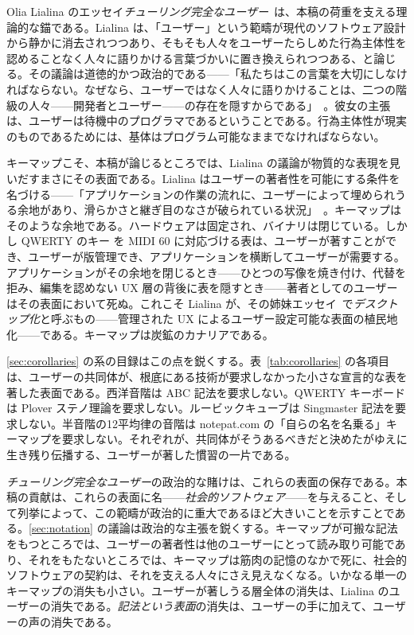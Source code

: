 \documentclass[10pt,letterpaper,twocolumn]{article}
\DeclareRobustCommand{\key}[1]{\tikz[baseline=(k.base)]{%
 \node[fill=keystroke, rounded corners=1.3pt, inner xsep=2.4pt,
    inner ysep=1.9pt, anchor=base, yshift=-1.2pt] at (0,0)
  {\footnotesize\ttfamily\bfseries\vphantom{A}\phantom{#1}};
 \node[draw=keystroke, line width=0.4pt, fill=keyfill,
    rounded corners=1.3pt, inner xsep=2.4pt, inner ysep=1.9pt,
    anchor=base] (k) at (0,0)
  {\footnotesize\ttfamily\bfseries\vphantom{A}#1};}}
\begin{document}
Olia Lialina のエッセイ\emph{チューリング完全なユーザー}~\citep{lialina2012turing,lialina2021turingbook}は、本稿の荷重を支える理論的な錨である。Lialina は、「ユーザー」という範疇が現代のソフトウェア設計から静かに消去されつつあり、そもそも人々をユーザーたらしめた行為主体性を認めることなく人々に語りかける言葉づかいに置き換えられつつある、と論じる。その議論は道徳的かつ政治的である——「私たちはこの言葉を大切にしなければならない。なぜなら、ユーザーではなく人々に語りかけることは、二つの階級の人々——開発者とユーザー——の存在を隠すからである」~\citep{lialina2012turing}。彼女の主張は、ユーザーは待機中のプログラマであるということである。行為主体性が現実のものであるためには、基体はプログラム可能なままでなければならない。

キーマップこそ、本稿が論じるところでは、Lialina の議論が物質的な表現を見いだすまさにその表面である。Lialina はユーザーの著者性を可能にする条件を名づける——「アプリケーションの作業の流れに、ユーザーによって埋められうる余地があり、滑らかさと継ぎ目のなさが破られている状況」~\citep{lialina2012turing}。キーマップはそのような余地である。ハードウェアは固定され、バイナリは閉じている。しかし QWERTY のキー \key{A} を MIDI 60 に対応づける表は、ユーザーが著すことができ、ユーザーが版管理でき、アプリケーションを横断してユーザーが需要する。アプリケーションがその余地を閉じるとき——ひとつの写像を焼き付け、代替を拒み、編集を認めない UX 層の背後に表を隠すとき——著者としてのユーザーはその表面において死ぬ。これこそ Lialina が、その姉妹エッセイ~\citep{lialina2018rich}で\emph{デスクトップ化}と呼ぶもの——管理された UX によるユーザー設定可能な表面の植民地化——である。キーマップは炭鉱のカナリアである。

\textsection\ref{sec:corollaries} の系の目録はこの点を鋭くする。表~\ref{tab:corollaries} の各項目は、ユーザーの共同体が、根底にある技術が要求しなかった小さな宣言的な表を著した表面である。西洋音階は ABC 記法を要求しない。QWERTY キーボードは Plover ステノ理論を要求しない。ルービックキューブは Singmaster 記法を要求しない。半音階の12平均律の音階は notepat.com の「自らの名を名乗る」キーマップを要求しない。それぞれが、共同体がそうあるべきだと決めたがゆえに生き残り伝播する、ユーザーが著した慣習の一片である。

\emph{チューリング完全なユーザー}の政治的な賭けは、これらの表面の保存である。本稿の貢献は、これらの表面に名——\emph{社会的ソフトウェア}——を与えること、そして列挙によって、この範疇が政治的に重大であるほど大きいことを示すことである。\textsection\ref{sec:notation} の議論は政治的な主張を鋭くする。キーマップが可搬な記法をもつところでは、ユーザーの著者性は他のユーザーにとって読み取り可能であり、それをもたないところでは、キーマップは筋肉の記憶のなかで死に、社会的ソフトウェアの契約は、それを支える人々にさえ見えなくなる。いかなる単一のキーマップの消失も小さい。ユーザーが著しうる層全体の消失は、Lialina のユーザーの消失である。\emph{記法という表面}の消失は、ユーザーの手に加えて、ユーザーの声の消失である。
\end{document}
